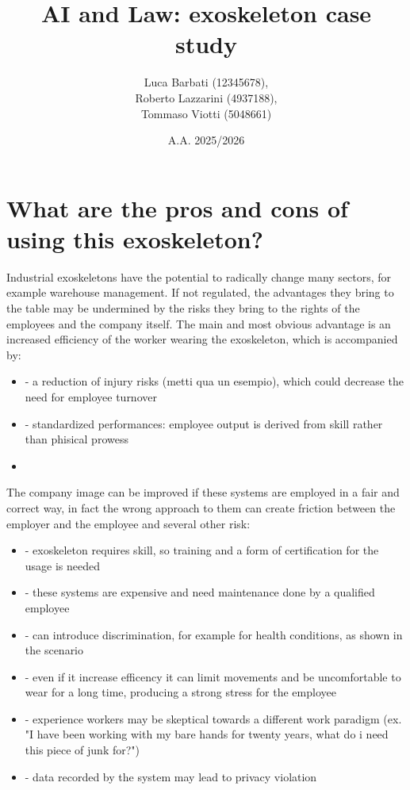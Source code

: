 \documentclass{article}
\title{AI and Law: exoskeleton case study}
\date{A.A. 2025/2026}
\author{Luca Barbati (12345678),\\Roberto Lazzarini (4937188),\\  Tommaso Viotti (5048661)}
\begin{document}
\maketitle
\newpage

\section{What are the pros and cons of using this exoskeleton?}
Industrial exoskeletons have the potential to radically change many sectors, for example warehouse management. 
If not regulated, the advantages they bring to the table may be undermined by the risks they bring to the rights of the employees and the company itself.
The main and most obvious advantage is an increased efficiency of the worker wearing the exoskeleton, which is accompanied by: 
\begin{itemize}
    \item - a reduction of injury risks (metti qua un esempio), which could decrease the need for employee turnover
    \item - standardized performances: employee output is derived from skill rather than phisical prowess
    \item 
\end{itemize}
The company image can be improved if these systems are employed in a fair and correct way, in fact the wrong approach to them can create friction between the employer and the employee and several other risk:
\begin{itemize}
    \item - exoskeleton requires skill, so training and a form of certification for the usage is needed
    \item - these systems are expensive and need maintenance done by a qualified employee
    \item - can introduce discrimination, for example for health conditions, as shown in the scenario
    \item - even if it increase efficency it can limit movements and be uncomfortable to wear for a long time, producing a strong stress for the employee
    \item - experience workers may be skeptical towards a different work paradigm (ex. "I have been working with my bare hands for twenty years, what do i need this piece of junk for?")
    \item - data recorded by the system may lead to privacy violation
\end{itemize}
\end{document}
